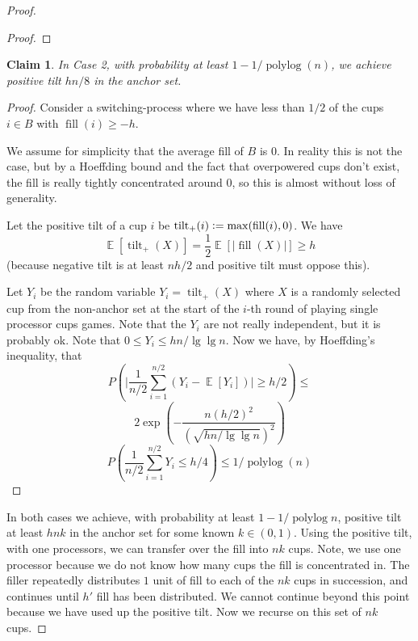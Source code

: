 \documentclass[twocolumn]{article}[11pt]
\DeclareMathOperator{\E}{\mathbb{E}}
\DeclareMathOperator{\polylog}{\text{polylog}}
\DeclareMathOperator{\tilt}{\text{tilt}}
\DeclareMathOperator{\fil}{\text{fill}}
\newcommand{\defeq}{\vcentcolon=}
\newtheorem{clm}{Claim}
\begin{document}
\begin{proof}
\begin{proof}
\end{proof}

\begin{clm}
  \label{clm:xtreme}
  In Case 2, with probability at least $1- 1/\polylog(n)$, we achieve positive tilt $hn/8$ in the anchor set.
\end{clm}

\begin{proof}
  Consider a switching-process where we have less than $1/2$ of the cups $i\in B$
  with $\fil(i) \ge -h$.


  We assume for simplicity that the average fill of $B$ is $0$. In reality this
  is not the case, but by a Hoeffding bound and the fact that overpowered cups don't
  exist, the fill is really tightly concentrated around $0$, so this is almost
  without loss of generality.

  Let the positive tilt of a cup $i$ be $\tilt_+(i) \defeq \max(\fil(i), 0)$.
  We have
  $$\E[\tilt_+(X)] = \frac{1}{2}\E[|\fil(X)|] \ge h$$
  (because negative tilt is at least $nh/2$ and positive tilt must oppose this).
  
  Let $Y_i$ be the random variable $Y_i=\tilt_+(X)$ where $X$ is a randomly
  selected cup from the non-anchor set at the start of the $i$-th round of
  playing single processor cups games. {\color{red}Note that the $Y_i$ are not really
  independent, but it is probably ok}. Note that $0\le Y_i \le hn/\lg\lg n$.
  Now we have, by Hoeffding's inequality, that 
  $$P\left(\Big|\frac{1}{n/2} \sum_{i=1}^{n/2} (Y_i - \E[Y_i])\Big|\ge h/2
  \right) \le$$
  $$2\exp\left(-\frac{n(h/2)^2}{(\sqrt{hn/\lg\lg n})^2}\right) $$
  $$P\left(\frac{1}{n/2}\sum_{i=1}^{n/2} Y_i \le h/4\right) \le 1/\polylog(n) $$

\end{proof}

  In both cases we achieve, with probability at least $1-1/\polylog n$,
  positive tilt at least $hnk$ in the anchor set for some known $k\in(0,1)$. Using the
  positive tilt, with one processors, we can transfer over the fill into $nk$ cups. 
  Note, we use one processor because we do not know how many cups the fill is
  concentrated in. The filler repeatedly distributes $1$ unit of fill to each
  of the $nk$ cups in succession, and continues until $h'$ fill has been
  distributed. We cannot continue beyond this point because we have used up the
  positive tilt. Now we recurse on this set of $nk$ cups.


\end{proof}
\end{document}
